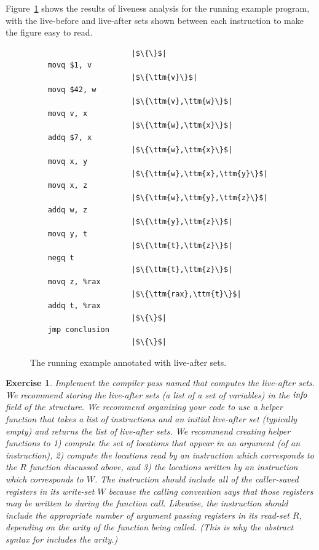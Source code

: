 \documentclass[11pt]{book}
\newtheorem{exercise}[theorem]{Exercise}
\begin{document}
Figure~\ref{fig:live-eg} shows the results of liveness analysis for
the running example program, with the live-before and live-after sets
shown between each instruction to make the figure easy to read.

\begin{figure}[tp]
\hspace{20pt}
\begin{minipage}{0.45\textwidth}
\begin{lstlisting}
                       |$\{\}$|    
    movq $1, v
                       |$\{\ttm{v}\}$|    
    movq $42, w
                       |$\{\ttm{v},\ttm{w}\}$|    
    movq v, x
                       |$\{\ttm{w},\ttm{x}\}$|    
    addq $7, x
                       |$\{\ttm{w},\ttm{x}\}$|    
    movq x, y
                       |$\{\ttm{w},\ttm{x},\ttm{y}\}$|    
    movq x, z
                       |$\{\ttm{w},\ttm{y},\ttm{z}\}$|    
    addq w, z
                       |$\{\ttm{y},\ttm{z}\}$|    
    movq y, t
                       |$\{\ttm{t},\ttm{z}\}$|    
    negq t
                       |$\{\ttm{t},\ttm{z}\}$|    
    movq z, %rax
                       |$\{\ttm{rax},\ttm{t}\}$|    
    addq t, %rax
                       |$\{\}$|
    jmp conclusion
                       |$\{\}$|
\end{lstlisting}
\end{minipage}

\caption{The running example annotated with live-after sets.}
\label{fig:live-eg}
\end{figure}

\begin{exercise}\normalfont
Implement the compiler pass named  that computes
the live-after sets. We recommend storing the live-after sets (a list
of a set of variables) in the $\mathit{info}$ field of the 
structure.
%
We recommend organizing your code to use a helper function that takes
a list of instructions and an initial live-after set (typically empty)
and returns the list of live-after sets.
%
We recommend creating helper functions to 1) compute the set of
locations that appear in an argument (of an instruction), 2) compute
the locations read by an instruction which corresponds to the $R$
function discussed above, and 3) the locations written by an
instruction which corresponds to $W$. The  instruction
should include all of the caller-saved registers in its write-set $W$
because the calling convention says that those registers may be
written to during the function call. Likewise, the 
instruction should include the appropriate number of argument passing
registers in its read-set $R$, depending on the arity of the function
being called. (This is why the abstract syntax for 
includes the arity.)

\end{exercise}
\end{document}
